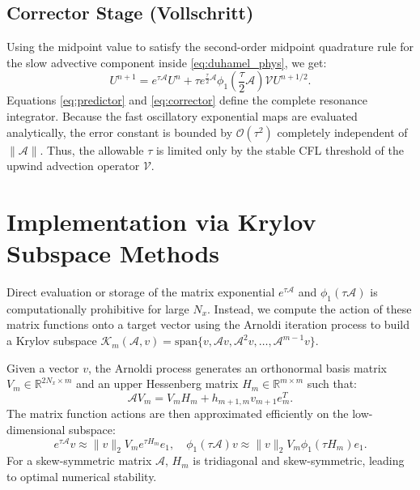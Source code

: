 \documentclass[11pt,a4paper]{article}
\begin{document}
\subsection{Corrector Stage (Vollschritt)}
Using the midpoint value to satisfy the second-order midpoint quadrature rule for the slow advective component inside \eqref{eq:duhamel_phys}, we get:
\begin{equation}
    U^{n+1} = e^{\tau\mathcal{A}}U^n + \tau e^{\frac{\tau}{2}\mathcal{A}}\phi_1\left(\frac{\tau}{2}\mathcal{A}\right)\mathcal{V}U^{n+1/2}. \label{eq:corrector}
\end{equation}
Equations \eqref{eq:predictor} and \eqref{eq:corrector} define the complete resonance integrator. Because the fast oscillatory exponential maps are evaluated analytically, the error constant is bounded by $\mathcal{O}(\tau^2)$ completely independent of $\| \mathcal{A} \|$. Thus, the allowable $\tau$ is limited only by the stable CFL threshold of the upwind advection operator $\mathcal{V}$.

\section{Implementation via Krylov Subspace Methods}
Direct evaluation or storage of the matrix exponential $e^{\tau\mathcal{A}}$ and $\phi_1(\tau\mathcal{A})$ is computationally prohibitive for large $N_x$. Instead, we compute the action of these matrix functions onto a target vector using the Arnoldi iteration process to build a Krylov subspace $\mathcal{K}_m(\mathcal{A}, v) = \text{span}\{v, \mathcal{A}v, \mathcal{A}^2v, \dots, \mathcal{A}^{m-1}v\}$.

Given a vector $v$, the Arnoldi process generates an orthonormal basis matrix $V_m \in \mathbb{R}^{2N_x \times m}$ and an upper Hessenberg matrix $H_m \in \mathbb{R}^{m \times m}$ such that:
\begin{equation}
    \mathcal{A}V_m = V_m H_m + h_{m+1,m}v_{m+1}e_m^T.
\end{equation}
The matrix function actions are then approximated efficiently on the low-dimensional subspace:
\begin{equation}
    e^{\tau\mathcal{A}}v \approx \|v\|_2 V_m e^{\tau H_m} e_1, \quad \phi_1(\tau\mathcal{A})v \approx \|v\|_2 V_m \phi_1(\tau H_m) e_1.
\end{equation}
For a skew-symmetric matrix $\mathcal{A}$, $H_m$ is tridiagonal and skew-symmetric, leading to optimal numerical stability.
\end{document}
